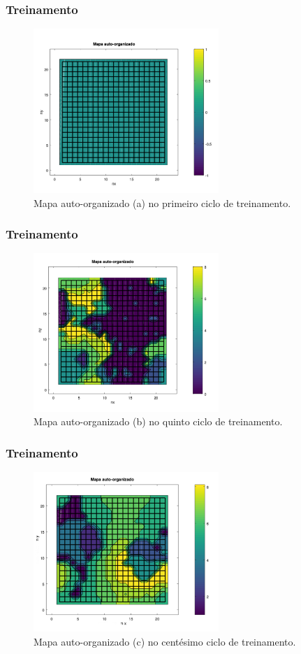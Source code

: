 \documentclass[aspectratio=10]{beamer} %
\begin{document}
\begin{frame}
\frametitle{Treinamento}
\begin{figure}
\centering
\includegraphics[width=7.0cm]{Imagens/SOM1_2d.pdf}
\caption{Mapa auto-organizado (a) no primeiro ciclo de treinamento.}
\end{figure}
\end{frame}

\begin{frame}
\frametitle{Treinamento}
\begin{figure}
\centering
\includegraphics[width=7.0cm]{Imagens/SOM5_2d.pdf}
\caption{Mapa auto-organizado (b) no quinto ciclo de treinamento.}
\end{figure}
\end{frame}

\begin{frame}
\frametitle{Treinamento}
\begin{figure}
\centering
\includegraphics[width=7.0cm]{Imagens/SOM100_2d.pdf}
\caption{Mapa auto-organizado (c) no centésimo ciclo de treinamento.}
\end{figure}
\end{frame}
\end{document}
